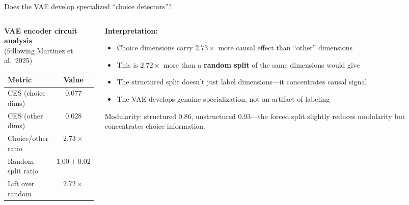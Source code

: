 \documentclass[aspectratio=169,11pt]{beamer}
\begin{document}
\begin{frame}{Does the VAE develop specialized ``choice detectors''?}
\begin{columns}[T]
\begin{column}{0.48\textwidth}
\textbf{VAE encoder circuit analysis}\\[0.2em]
{\small (following Martinez et al.\ 2025)}

\vspace{0.5em}
\centering
{\small
\begin{tabular}{lc}
\toprule
\textbf{Metric} & \textbf{Value} \\
\midrule
CES (choice dims) & $0.077$ \\
CES (other dims) & $0.028$ \\
Choice/other ratio & $\mathbf{2.73\times}$ \\
Random-split ratio & $1.00 \pm 0.02$ \\
Lift over random & $\mathbf{2.72\times}$ \\
\bottomrule
\end{tabular}
}
\end{column}
\begin{column}{0.50\textwidth}
\textbf{Interpretation:}\\[0.3em]
{\small
\begin{itemize}\setlength\itemsep{3pt}
  \item Choice dimensions carry $2.73\times$ more causal effect than ``other'' dimensions
  \item This is $2.72\times$ more than a \textbf{random split} of the same dimensions would give
  \item The structured split doesn't just label dimensions---it concentrates causal signal
  \item The VAE develops genuine specialization, not an artifact of labeling
\end{itemize}
}

\vspace{0.3em}
{\small Modularity: structured $0.86$, unstructured $0.93$---the forced split slightly reduces modularity but concentrates choice information.}
\end{column}
\end{columns}
\end{frame}
\end{document}
